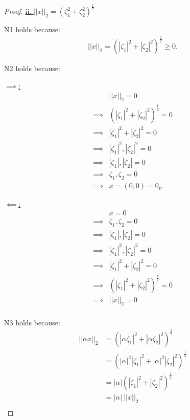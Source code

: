 \documentclass{article}
\begin{document}
\begin{proof}
  \underline{ii. $||x||_2 = (\zeta_1^2 + \zeta_2^2)^{\frac{1}{2}}$}
  \newline
  
  N1 holds because:
  \begin{align*}
    ||x||_2 = (|\zeta_1|^2 + |\zeta_2|^2)^{\frac{1}{2}} \geq 0.
  \end{align*}

  N2 holds because:

  \underline{$\implies$:}
  \begin{align*}
    & ||x||_2 = 0 \\
    \implies& (|\zeta_1|^2 + |\zeta_2|^2)^\frac{1}{2} = 0 \\
    \implies& |\zeta_1|^2 + |\zeta_2|^2 = 0 \\
    \implies& |\zeta_1|^2, |\zeta_2|^2 = 0 \\
    \implies& |\zeta_1|, |\zeta_2| = 0 \\
    \implies& \zeta_1, \zeta_2 = 0 \\
    \implies& x = (0, 0) = 0_v.
  \end{align*}

  \underline{$\impliedby$:}
  \begin{align*}
    & x = 0 \\
    \implies& \zeta_1, \zeta_2 = 0 \\
    \implies& |\zeta_1|, |\zeta_2| = 0 \\
    \implies& |\zeta_1|^2, |\zeta_2|^2 = 0 \\
    \implies& |\zeta_1|^2 + |\zeta_2|^2 = 0 \\
    \implies& (|\zeta_1|^2 + |\zeta_2|^2)^\frac{1}{2} = 0 \\
    \implies& ||x||_2 = 0 \\
  \end{align*}

  N3 holds because:
  \begin{align*}
    ||\alpha x||_2
    &= (|\alpha \zeta_1|^2 + |\alpha \zeta_2|^2)^\frac{1}{2} \\
    &= (|\alpha|^2 |\zeta_1|^2 + |\alpha|^2 |\zeta_2|^2)^\frac{1}{2} \\
    &= |\alpha| (|\zeta_1|^2 + |\zeta_2|^2)^\frac{1}{2} \\
    &= |\alpha| \: ||x||_2 \\
  \end{align*}


\end{proof}
\end{document}

